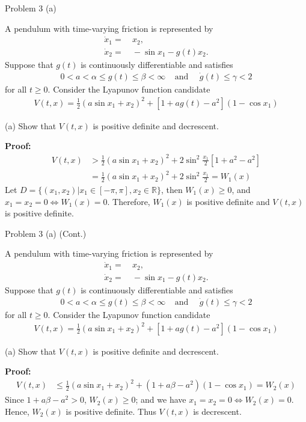 \documentclass[8pt]{beamer}
\let\tempone\itemize
\let\temptwo\enditemize
\newenvironment{proitemize}{\vspace{-1em}\tempone}{\temptwo}%
\begin{document}
\begin{frame}[t]{Problem 3 (a)}
  \begin{block}{}
  A pendulum with time-varying friction is represented by
\begin{align*}
\dot x_1=&~x_2,\\
\dot x_2=&~-\sin x_1-g(t)x_2.
\end{align*}
Suppose that $g(t)$ is continuously differentiable and satisfies
\begin{align*}
0<a<\alpha\leq g(t)\leq \beta<\infty ~~~~~\mbox{and}~~~~~~\dot g(t)\leq \gamma<2
\end{align*}
for all $t\geq 0$. Consider the Lyapunov function candidate
\begin{align*}
V(t,x)=\frac{1}{2}(a\sin x_1+x_2)^2+[1+ag(t)-a^2](1-\cos x_1)
\end{align*}
\begin{proitemize}
\item[(a)] Show that $V(t,x)$ is positive definite and decrescent.
\end{proitemize}
\end{block}
{\bf Proof:}
\begin{align*}
  V(t,x)&>\frac{1}{2}(a\sin x_1+x_2)^2+2\sin^2{\frac{x_1}{2}} [1+a^2-a^2] \\
  &=\frac{1}{2}(a\sin x_1+x_2)^2+2\sin^2\frac{x_1}{2}=W_1(x)
\end{align*}
Let $D=\{(x_1,x_2)|x_1 \in [-\pi,\pi],x_2 \in \mathbb{R} \}$, then $W_1(x)\ge0$, and $x_1=x_2=0\iff W_1(x)=0$. Therefore, $W_1(x)$ is positive definite and $V(t,x)$ is positive definite.

\end{frame}

\begin{frame}[t]{Problem 3 (a) (Cont.)}
  \begin{block}{}
  A pendulum with time-varying friction is represented by
\begin{align*}
\dot x_1=&~x_2,\\
\dot x_2=&~-\sin x_1-g(t)x_2.
\end{align*}
Suppose that $g(t)$ is continuously differentiable and satisfies
\begin{align*}
0<a<\alpha\leq g(t)\leq \beta<\infty ~~~~~\mbox{and}~~~~~~\dot g(t)\leq \gamma<2
\end{align*}
for all $t\geq 0$. Consider the Lyapunov function candidate
\begin{align*}
V(t,x)=\frac{1}{2}(a\sin x_1+x_2)^2+[1+ag(t)-a^2](1-\cos x_1)
\end{align*}
\begin{proitemize}
\item[(a)] Show that $V(t,x)$ is positive definite and decrescent.
\end{proitemize}
\end{block}
{\bf Proof:}
\begin{align*}
  V(t,x) & \le \frac{1}{2}(a\sin x_1+x_2)^2+(1+a\beta-a^2)(1-\cos x_1)=W_2(x) 
\end{align*}
Since $1+a\beta-a^2 > 0$, $W_2(x)\ge 0$; and we have $x_1=x_2=0\iff W_2(x)=0$. Hence, $W_2(x)$ is positive definite. Thus $V(t,x)$ is decrescent.

\end{frame}
\end{document}
